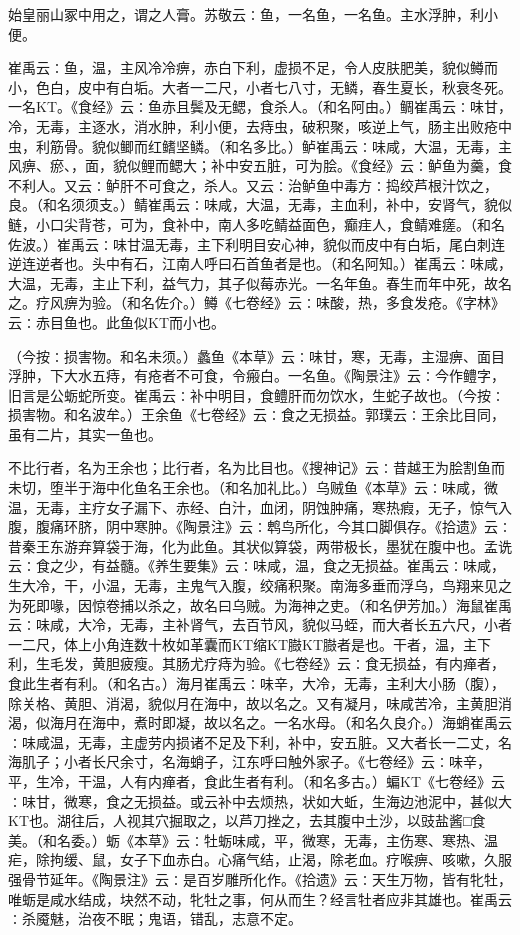 \documentclass[a4paper,12pt,UTF8,twoside]{ctexbook}
\begin{document}
始皇丽山冢中用之，谓之人膏。苏敬云∶鱼，一名鱼，一名鱼。主水浮肿，利小便。

崔禹云∶鱼，温，主风冷冷痹，赤白下利，虚损不足，令人皮肤肥美，貌似鳟而小，色白，皮中有白垢。大者一二尺，小者七八寸，无鳞，春生夏长，秋衰冬死。一名KT。《食经》云∶鱼赤且鬓及无鳃，食杀人。（和名阿由。）鲷崔禹云∶味甘，冷，无毒，主逐水，消水肿，利小便，去痔虫，破积聚，咳逆上气，肠主出败疮中虫，利筋骨。貌似鲫而红鳍坚鳞。（和名多比。）鲈崔禹云∶味咸，大温，无毒，主风痹、瘀、，面，貌似鲤而鳃大；补中安五脏，可为脍。《食经》云∶鲈鱼为羹，食不利人。又云∶鲈肝不可食之，杀人。又云∶治鲈鱼中毒方∶捣绞芦根汁饮之，良。（和名须须支。）鲭崔禹云∶味咸，大温，无毒，主血利，补中，安肾气，貌似鲢，小口尖背苍，可为，食补中，南人多吃鲭益面色，癫疰人，食鲭难瘥。（和名佐波。）崔禹云∶味甘温无毒，主下利明目安心神，貌似而皮中有白垢，尾白刺连逆连逆者也。头中有石，江南人呼曰石首鱼者是也。（和名阿知。）崔禹云∶味咸，大温，无毒，主止下利，益气力，其子似莓赤光。一名年鱼。春生而年中死，故名之。疗风痹为验。（和名佐介。）鳟《七卷经》云∶味酸，热，多食发疮。《字林》云∶赤目鱼也。此鱼似KT而小也。

（今按∶损害物。和名未须。）蠡鱼《本草》云∶味甘，寒，无毒，主湿痹、面目浮肿，下大水五痔，有疮者不可食，令瘢白。一名鱼。《陶景注》云∶今作鳢字，旧言是公蛎蛇所变。崔禹云∶补中明目，食鳢肝而勿饮水，生蛇子故也。（今按∶损害物。和名波牟。）王余鱼《七卷经》云∶食之无损益。郭璞云∶王余比目同，虽有二片，其实一鱼也。

不比行者，名为王余也；比行者，名为比目也。《搜神记》云∶昔越王为脍割鱼而未切，堕半于海中化鱼名王余也。（和名加礼比。）乌贼鱼《本草》云∶味咸，微温，无毒，主疗女子漏下、赤经、白汁，血闭，阴蚀肿痛，寒热瘕，无子，惊气入腹，腹痛环脐，阴中寒肿。《陶景注》云∶鹎鸟所化，今其口脚俱存。《拾遗》云∶昔秦王东游弃算袋于海，化为此鱼。其状似算袋，两带极长，墨犹在腹中也。孟诜云∶食之少，有益髓。《养生要集》云∶味咸，温，食之无损益。崔禹云∶味咸，生大冷，干，小温，无毒，主鬼气入腹，绞痛积聚。南海多垂而浮乌，鸟翔来见之为死即喙，因惊卷捕以杀之，故名曰乌贼。为海神之吏。（和名伊芳加。）海鼠崔禹云∶味咸，大冷，无毒，主补肾气，去百节风，貌似马蛭，而大者长五六尺，小者一二尺，体上小角连数十枚如革囊而KT缩KT臌KT臌者是也。干者，温，主下利，生毛发，黄胆疲瘦。其肠尤疗痔为验。《七卷经》云∶食无损益，有内瘅者，食此生者有利。（和名古。）海月崔禹云∶味辛，大冷，无毒，主利大小肠（腹），除关格、黄胆、消渴，貌似月在海中，故以名之。又有凝月，味咸苦冷，主黄胆消渴，似海月在海中，煮时即凝，故以名之。一名水母。（和名久良介。）海蛸崔禹云∶味咸温，无毒，主虚劳内损诸不足及下利，补中，安五脏。又大者长一二丈，名海肌子；小者长尺余寸，名海蛸子，江东呼曰触外家子。《七卷经》云∶味辛，平，生冷，干温，人有内瘅者，食此生者有利。（和名多古。）蝙KT《七卷经》云∶味甘，微寒，食之无损益。或云补中去烦热，状如大蚯，生海边池泥中，甚似大KT也。湖往后，人视其穴掘取之，以芦刀挫之，去其腹中土沙，以豉盐酱□食美。（和名委。）蛎《本草》云∶牡蛎味咸，平，微寒，无毒，主伤寒、寒热、温疟，除拘缓、鼠，女子下血赤白。心痛气结，止渴，除老血。疗喉痹、咳嗽，久服强骨节延年。《陶景注》云∶是百岁雕所化作。《拾遗》云∶天生万物，皆有牝牡，唯蛎是咸水结成，块然不动，牝牡之事，何从而生？经言牡者应非其雄也。崔禹云∶杀魇魅，治夜不眠；鬼语，错乱，志意不定。
\end{document}
